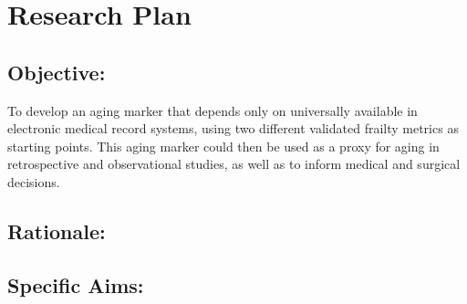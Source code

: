 \section{Research Plan }\label{research-plan}


\subsection{Objective:}\label{objective}
  
To develop an aging marker\cite{Orkaby_2017} that depends only on universally available in electronic medical record systems,
using two different validated frailty metrics as starting points. This
aging marker could then be used as a proxy for aging in retrospective
and observational studies, as well as to inform medical and surgical
decisions.


\subsection{Rationale:}\label{rationale}

\subsection{Specific Aims:}\label{specific-aims}

